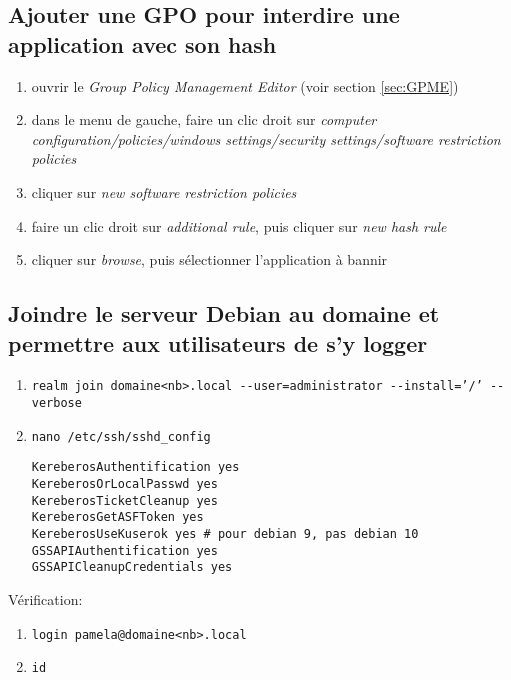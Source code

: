 \documentclass[a4paper]{article}
\begin{document}
\subsection{Ajouter une GPO pour interdire une application avec son hash}



\begin{enumerate}
    \item ouvrir le \textit{Group Policy Management Editor} (voir section \ref{sec:GPME})
    \item dans le menu de gauche, faire un clic droit sur \textit{computer configuration/policies/windows settings/security settings/software restriction policies}
    \item cliquer sur \textit{new software restriction policies}
    \item faire un clic droit sur \textit{additional rule}, puis cliquer sur \textit{new hash rule}
    \item cliquer sur \textit{browse}, puis sélectionner l'application à bannir
\end{enumerate}





\subsection{Joindre le serveur Debian au domaine et permettre aux utilisateurs de s'y logger}



\begin{enumerate}
    \item \texttt{realm join domaine<nb>.local -{}-user=administrator -{}-install='/' -{}-verbose}
    \item \texttt{nano /etc/ssh/sshd\_config}
    \begin{example} \begin{verbatim}
KereberosAuthentification yes
KereberosOrLocalPasswd yes
KereberosTicketCleanup yes
KereberosGetASFToken yes
KereberosUseKuserok yes # pour debian 9, pas debian 10
GSSAPIAuthentification yes
GSSAPICleanupCredentials yes
    \end{verbatim} \end{example}
\end{enumerate}
Vérification:
\begin{enumerate}
    \item \texttt{login pamela@domaine<nb>.local}
    \item \texttt{id}
\end{enumerate}
\end{document}
